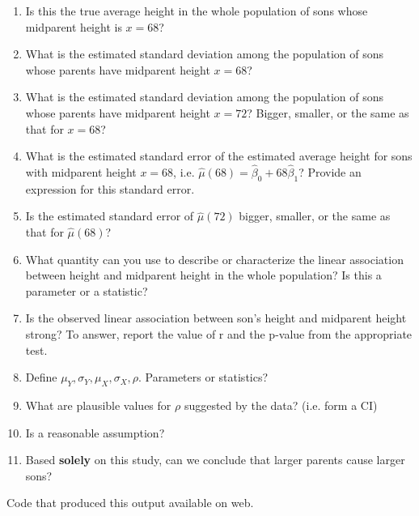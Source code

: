\begin{enumerate}
\item Is this the true average height in the whole population of sons whose midparent height is $x=68$?
\item What is the estimated standard deviation among the population of sons whose parents have midparent height $x=68$?  
\item What is the estimated standard deviation among the population of sons whose parents have midparent height $x=72$?  
Bigger, smaller, or the same as that for $x=68$?
\item What is the estimated standard error of the estimated average height for sons with midparent height $x=68$, i.e. $\hat\mu(68)=\hat\beta_0 + 68 \hat\beta_1$?
Provide an expression for this standard error.
\item Is the estimated standard error of $\hat\mu(72)$ bigger, smaller, or the same as that for $\hat\mu(68)$?
\item What quantity can you use to describe or characterize the linear association between height and midparent height in the whole population?
Is this a parameter or a statistic?
\item Is the observed linear association between son's height and midparent height strong?  To answer, report the value of r and the p-value from the appropriate test.
\item Define $\mu_Y,\sigma_Y,\mu_X,\sigma_X,\rho$. Parameters or statistics?
\item What are plausible values for $\rho$ suggested by the data? (i.e. form a CI)
\item Is  a reasonable assumption?
\item Based \textbf{solely} on this study, can we conclude that larger parents cause larger sons?
\end{enumerate}

\newpage

Code that produced this output available on web.

